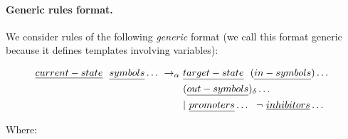 \paragraph{Generic rules format.}
We consider rules of the following \emph{generic} format 
(we call this format generic because it defines templates involving variables):
\begin{framed}
\vspace{-0.6cm}
\begin{align*}
\emph{current-state} ~~ \emph{symbols} \dots ~ \rightarrow_\alpha ~ & \emph{target-state} ~~ (\emph{in-symbols}) \dots ~~ \\
 & (\emph{out-symbols})_\delta \dots \\
 & | ~  \emph{promoters} \dots ~~ \neg ~  \emph{inhibitors} \dots
\end{align*}
\vspace{-0.8cm}
\end{framed}
Where:
